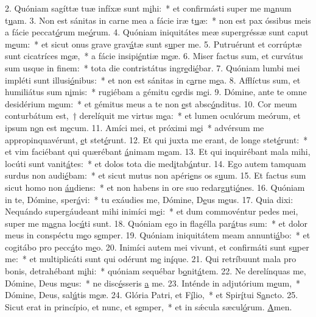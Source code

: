 2. Quóniam sagíttæ tuæ infíxæ sunt m\uline{i}hi:~* et confirmásti super me m\uline{a}num t\uline{u}am.
3. Non est sánitas in carne mea a fácie iræ t\uline{u}æ:~* non est pax óssibus meis a fácie peccat\uline{ó}rum me\uline{ó}rum.
4. Quóniam iniquitátes meæ supergréssæ sunt caput m\uline{e}um:~* et sicut onus grave grav\uline{á}tæ sunt s\uline{u}per me.
5. Putruérunt et corrúptæ sunt cicatríces m\uline{e}æ,~* a fácie insipi\uline{é}ntiæ m\uline{e}æ.
6. Miser factus sum, et curvátus sum usque in f\uline{i}nem:~* tota die contristátus ingr\uline{e}di\uline{é}bar.
7. Quóniam lumbi mei impléti sunt illusi\uline{ó}nibus:~* et non est sánitas in c\uline{a}rne m\uline{e}a.
8. Afflíctus sum, et humiliátus sum n\uline{i}mis:~* rugiébam a gémitu c\uline{o}rdis m\uline{e}i.
9. Dómine, ante te omne desidérium m\uline{e}um:~* et gémitus meus a te non \uline{e}st absc\uline{ó}nditus.
10. Cor meum conturbátum est,~† derelíquit me virtus m\uline{e}a:~* et lumen oculórum meórum, et ipsum n\uline{o}n est m\uline{e}cum.
11. Amíci mei, et próximi m\uline{e}i~* advérsum me appropinquavérunt, \uline{e}t stet\uline{é}runt.
12. Et qui juxta me erant, de longe stet\uline{é}runt:~* et vim faciébant qui quærébant \uline{á}nimam m\uline{e}am.
13. Et qui inquirébant mala mihi, locúti sunt vanit\uline{á}tes:~* et dolos tota die med\uline{i}tab\uline{á}ntur.
14. Ego autem tamquam surdus non audi\uline{é}bam:~* et sicut mutus non apéri\uline{e}ns os s\uline{u}um.
15. Et factus sum sicut homo non \uline{áu}diens:~* et non habens in ore suo redarg\uline{u}ti\uline{ó}nes.
16. Quóniam in te, Dómine, sper\uline{á}vi:~* tu exáudies me, Dómine, D\uline{e}us m\uline{e}us.
17. Quia dixi: Nequándo supergáudeant mihi inimíci m\uline{e}i:~* et dum commovéntur pedes mei, super me m\uline{a}gna loc\uline{ú}ti sunt.
18. Quóniam ego in flagélla par\uline{á}tus sum:~* et dolor meus in conspéctu m\uline{e}o s\uline{e}mper.
19. Quóniam iniquitátem meam annunti\uline{á}bo:~* et cogitábo pro pecc\uline{á}to m\uline{e}o.
20. Inimíci autem mei vivunt, et confirmáti sunt s\uline{u}per me:~* et multiplicáti sunt qui odérunt m\uline{e} in\uline{í}que.
21. Qui retríbuunt mala pro bonis, detrahébant m\uline{i}hi:~* quóniam sequébar b\uline{o}nit\uline{á}tem.
22. Ne derelínquas me, Dómine, Deus m\uline{e}us:~* ne disc\uline{é}sseris \uline{a} me.
23. Inténde in adjutórium m\uline{e}um,~* Dómine, Deus, sal\uline{ú}tis m\uline{e}æ.
24. Glória Patri, et F\uline{í}lio,~* et Spir\uline{í}tui S\uline{a}ncto.
25. Sicut erat in princípio, et nunc, et s\uline{e}mper,~* et in sǽcula sæcul\uline{ó}rum. \uline{A}men.
